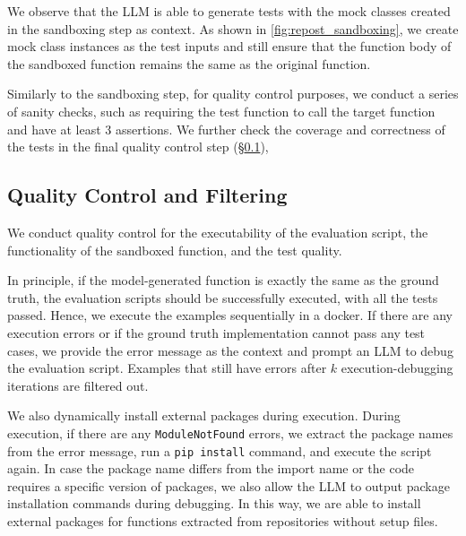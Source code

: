 We observe that the LLM is able to generate tests with the mock classes created in the sandboxing step as context. 
As shown in \autoref{fig:repost_sandboxing}, we create mock class instances as the test inputs and still ensure that the function body of the sandboxed function remains the same as the original function.

Similarly to the sandboxing step, for quality control purposes, we conduct a series of sanity checks, such as requiring the test function to call the target function and have at least 3 assertions.
We further check the coverage and correctness of the tests in the final quality control step (\S\ref{sec:quality_control}), 


\subsection{Quality Control and Filtering}
\label{sec:quality_control}

We conduct quality control for the executability of the evaluation script, the functionality of the sandboxed function, and the test quality.

In principle, if the model-generated function is exactly the same as the ground truth, the evaluation scripts should be successfully executed, with all the tests passed.
Hence, we execute the examples sequentially in a docker. If there are any execution errors or if the ground truth implementation cannot pass any test cases, we provide the error message as the context and prompt an LLM to debug the evaluation script. Examples that still have errors after $k$ execution-debugging iterations are filtered out.

We also dynamically install external packages during execution.
During execution, if there are any \texttt{ModuleNotFound} errors, we extract the package names from the error message, run a \texttt{pip install} command, and execute the script again.
In case the package name differs from the import name or the code requires a specific version of packages, we also allow the LLM to output package installation commands during debugging.
In this way, we are able to install external packages for functions extracted from repositories without setup files.


